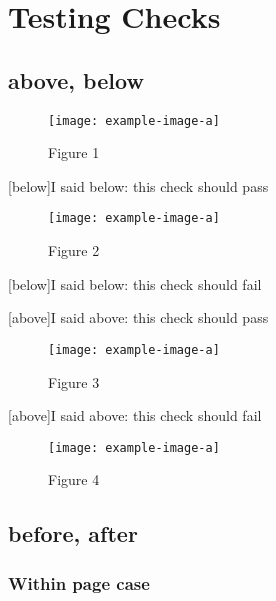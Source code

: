 \documentclass{book}
\begin{document}
\part{Testing Checks}

\chapter{above, below}

\begin{figure}
  \centering
  \caption{Figure 1}
  \texttt{[image: example-image-a]}
\end{figure}

[below]{I said below: this check should pass}

\clearpage{}

\begin{figure}[h]
  \centering
  \caption{Figure 2}
  \texttt{[image: example-image-a]}
\end{figure}

[below]{I said below: this check should fail}

\clearpage{}

[above]{I said above: this check should pass}

\begin{figure}
  \centering
  \caption{Figure 3}
  \texttt{[image: example-image-a]}
\end{figure}

\clearpage{}

[above]{I said above: this check should fail}

\begin{figure}[h]
  \centering
  \caption{Figure 4}
  \texttt{[image: example-image-a]}
\end{figure}

\chapter{before, after}

\section{Within page case}
\end{document}
